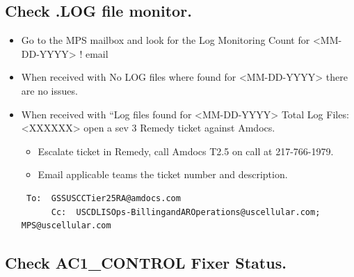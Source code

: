 \documentclass[12pt,twoside]{article}
\begin{document}
\subsection{Check .LOG file monitor.}
\label{sec-4-3}

\begin{itemize}
\item Go to the MPS mailbox and look for the Log Monitoring Count for <MM-DD-YYYY> ! email
\item When received with No LOG files where found for  <MM-DD-YYYY> there are no issues.
\item When received with ``Log files found for <MM-DD-YYYY> Total Log Files:  <XXXXXX> open a sev 3 Remedy ticket against Amdocs.
\begin{itemize}
\item Escalate ticket in Remedy, call Amdocs T2.5 on call at 217-766-1979.
\item Email applicable teams the ticket number and description.
\end{itemize}
\begin{verbatim}
 To:  GSSUSCCTier25RA@amdocs.com
      Cc:  USCDLISOps-BillingandAROperations@uscellular.com; MPS@uscellular.com
\end{verbatim}
\end{itemize}
\subsection{Check AC1\_CONTROL Fixer Status.}
\label{sec-4-4}
\end{document}
